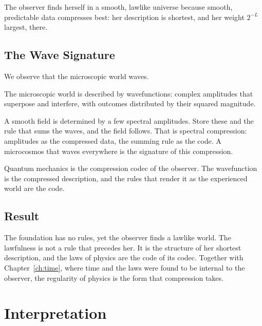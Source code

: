 \documentclass[11pt]{book}
\begin{document}
\begin{deduction}[Order]\label{ded:order}
  The observer finds herself in a smooth, lawlike universe because
  smooth, predictable data compresses best: her description is shortest,
  and her weight $2^{-L}$ largest, there.
\end{deduction}


\section{The Wave Signature}
\label{sec:waves}

We observe that the microscopic world waves.

\begin{axiom}\label{ax:waves}
  The microscopic world is described by wavefunctions: complex amplitudes
  that superpose and interfere, with outcomes distributed by their squared
  magnitude.
\end{axiom}

A smooth field is determined by a few spectral amplitudes. Store these and
the rule that sums the waves, and the field follows. That is spectral
compression: amplitudes as the compressed data, the summing rule as the
code. A microcosmos that waves everywhere is the signature of this
compression.

\begin{deduction}\label{ded:codec}
  Quantum mechanics is the compression codec of the observer. The
  wavefunction is the compressed description, and the rules that render it
  as the experienced world are the code.
\end{deduction}


\section{Result}

The foundation has no rules, yet the observer finds a lawlike world. The
lawfulness is not a rule that precedes her. It is the structure of her
shortest description, and the laws of physics are the code of its codec.
Together with Chapter~\ref{ch:time}, where time and the laws were found to
be internal to the observer, the regularity of physics is the form that
compression takes.


\chapter{Interpretation}
\label{ch:interpretation}
\end{document}
